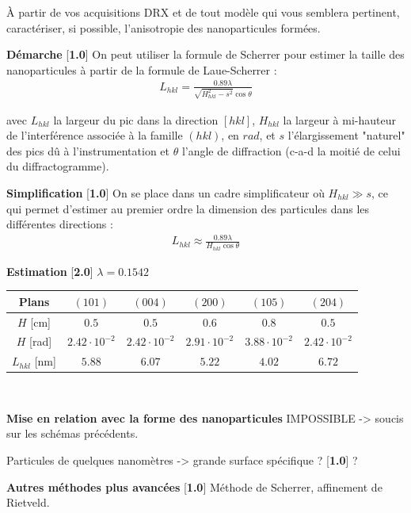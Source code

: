 \documentclass[twoside,a4paper,11pt,addpoints]{exam}%
\newcounter{foo} %
\begin{document}
\begin{questions}
\question[6] \`{A} partir de vos acquisitions DRX et de tout modèle qui vous semblera pertinent, caractériser, si possible, l'anisotropie des nanoparticules formées.

\begin{mybox}
\begin{solution}[8cm]

\textbf{Démarche} [\textbf{1.0}] On peut utiliser la formule de Scherrer pour estimer la taille des nanoparticules à partir de la formule de Laue-Scherrer : 
\begin{align*}
L_{hkl} = \frac{0.89 \lambda}{\sqrt{H_{hkl}^2 - s^2} \cos \theta}
\end{align*}

avec $L_{hkl}$ la largeur du pic dans la direction $[hkl]$, $H_{hkl}$ la largeur à mi-hauteur de l'interférence associée à la famille $(hkl)$, en $rad$, et $s$ l'élargissement "naturel" des pics dû à l'instrumentation et $\theta$ l'angle de diffraction (c-a-d la moitié de celui du diffractogramme).

\textbf{Simplification} [\textbf{1.0}] On se place dans un cadre simplificateur où $H_{hkl} \gg s$, ce qui permet d'estimer au premier ordre la dimension des particules dans les différentes directions : 
\begin{align*}
L_{hkl} \approx \frac{0.89 \lambda}{ H_{hkl} \cos \theta}
\end{align*}

\textbf{Estimation} [\textbf{2.0}] $\lambda = 0.1542$

\begin{center}
\begin{tabular}{cccccc}
\toprule
Plans & $(101)$ & $(004)$ & $(200)$ & $(105)$ & $(204)$ \\
\midrule
$H$ [\si{\centi\meter}] & $0.5$ & $0.5$ & $0.6$ & $0.8$ & $0.5$ \\
$H$ [\si{{rad}}] & $2.42 \cdot 10^{-2}$ & $2.42 \cdot 10^{-2}$ & $2.91 \cdot 10^{-2}$ & $3.88 \cdot 10^{-2}$ & $2.42 \cdot 10^{-2}$ \\
$L_{hkl}$ [\si{\nano\meter}] & $5.88$ & $6.07$ & $5.22$ & $4.02$ & $6.72$ \\
\bottomrule
\end{tabular}
\end{center}

~\

\textbf{\color{red} Mise en relation avec la forme des nanoparticules} IMPOSSIBLE -> soucis sur les schémas précédents.

Particules de quelques nanomètres -> grande surface spécifique ? [\textbf{1.0}] ?

\textbf{Autres méthodes plus avancées} [\textbf{1.0}] Méthode de Scherrer, affinement de Rietveld.

\end{solution}
\end{mybox}

\setcounter{foo}{\value{question}}

\end{questions}
\end{document}
